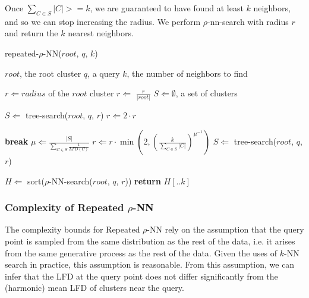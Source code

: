 Once $\sum_{C \in S} |C| >= k$, we are guaranteed to have found at least $k$ neighbors, and so we can stop increasing the radius.
We perform $\rho$-nn-search with radius $r$ and return the $k$ nearest neighbors.

\begin{algorithm} %
    \caption{repeated-$\rho$-NN($root$, $q$, $k$)} %
    \label{alg:knn:repeated-rnn} %
    \begin{algorithmic} %
        \REQUIRE $root$, the root cluster
        \REQUIRE $q$, a query
        \REQUIRE $k$, the number of neighbors to find

        \STATE $r \Leftarrow radius$ of the $root$ cluster
        \STATE $r \Leftarrow$ $\frac{r}{|root|}$
        \STATE $S \Leftarrow \emptyset$, a set of clusters

            \STATE $S \Leftarrow$ tree-search($root$, $q$, $r$)
            \STATE $r \Leftarrow 2 \cdot r$
        \ENDWHILE

        \ALOOP{}
                \STATE \textbf{break}
            \ENDIF
            \STATE $\mu \Leftarrow \frac{|S|}{\sum_{C \in S} \frac{1}{LFD(C)}}$
            \STATE $r \Leftarrow r \cdot \min \left( 2, \left( {\frac{k}{\sum_{C \in S} |C|}} \right)^{\mu^{-1}} \right)$
            \STATE $S \Leftarrow$ tree-search($root$, $q$, $r$)
        \ENDLOOP

        \STATE $H \Leftarrow$ sort($\rho$-NN-search($root$, $q$, $r$))
        \STATE \textbf{return} $H[.. k]$
    \end{algorithmic}
\end{algorithm}


\subsubsection{Complexity of Repeated \texorpdfstring{$\rho$}{p}-NN}
\label{subsubsec:methods:repeated-rnn-complexity}

The complexity bounds for Repeated $\rho$-NN rely on the assumption that the query point is sampled from the same distribution as the rest of the data, i.e. it arises from the same generative process as the rest of the data.
Given the uses of $k$-NN search in practice, this assumption is reasonable.
From this assumption, we can infer that the LFD at the query point does not differ significantly from the (harmonic) mean LFD of clusters near the query.

